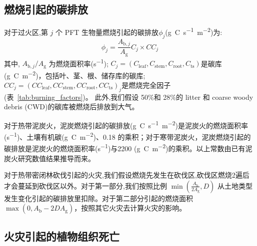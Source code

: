 \subsection{燃烧引起的碳排放}

对于过火区,第 $j$ 个 PFT 生物量燃烧引起的碳排放${\phi}_{j} $(\unit{g.C.s^{-1}.m^{-2}})为:
%
\begin{equation}
  \phi_{j}=\frac{A_{\mathrm{b},j}}{A_{\mathrm{g}}} C_{j} \times C C_{j}
\end{equation}
%
其中, $A_{\mathrm{b},j}/A_{\mathrm {g}} $ 为燃烧面积率(\unit{s^{-1}}); $
C_{j}=\left(C_{\mathrm{leaf}}, C_{\mathrm{stem}}, C_{\mathrm{root}}, C_{\mathrm{t s}}\right)
$是碳库(\unit{g.C.m^{-2}})，包括叶、茎、根、储存库的碳库; $
C C_{j}=\left(C C_{\mathrm{leaf}}, C C_{\mathrm{stem}}, C C_{\mathrm{root}}, C C_{\mathrm{t s}}\right)_{j}
$是燃烧完全因子 (表~\ref{tab:burning_factors})。 此外,我们假设 50\%和 28\%的 litter 和 coarse woody debris (CWD)的碳库被燃烧后排放到大气。


对于热带泥炭火，泥炭燃烧引起的碳排放(\unit{g.C.s^{-1}.m^{-2}})是泥炭火的燃烧面积率(\unit{s^{-1}})、土壤有机碳(\unit{g.C.m^{-2}})、0.18 的乘积；对于寒带泥炭火，泥炭燃烧引起的碳排放是泥炭火的燃烧面积率(\unit{s^{-1}})与2200 (\unit{g.C.m^{-2}})的乘积。以上常数由已有泥炭火研究数值结果推导而来。

对于热带密闭林砍伐引起的火灾,我们假设燃烧先发生在砍伐区,砍伐区燃烧2遍后才会蔓延到砍伐区以外。对于第一部分,我们按照比例 $\min \left(\frac{A_{\mathrm{b}}}{2 A_{\mathrm{g}}}, D\right)$ 从土地类型发生变化引起的碳排放里扣除。对于第二部分引起的燃烧面积 $\max(0, A_{\mathrm {b}} -2DA_{\mathrm {g}} )$，按照其它火灾去计算火灾的影响。


\subsection{火灾引起的植物组织死亡}

